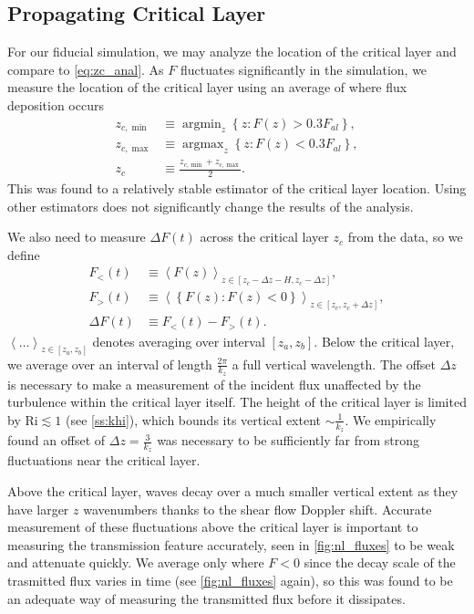 \documentclass[
        fleqn,
        usenatbib,
    ]{mnras}
\newcommand*{\ev}[1]{\left\langle#1\right\rangle}
\newcommand*{\z}[1]{\left\{#1\right\}}
\DeclareMathOperator*{\argmin}{argmin}
\DeclareMathOperator*{\argmax}{argmax}
\begin{document}
\subsection{Propagating Critical Layer}

For our fiducial simulation, we may analyze the location of the critical layer
and compare to \autoref{eq:zc_anal}. As $F$ fluctuates significantly in the
simulation, we measure the location of the critical layer using an average of
where flux deposition occurs
\begin{align}
    z_{c, \min} &\equiv \argmin_z \z{z: F(z) > 0.3F_{al}},\\
    z_{c, \max} &\equiv \argmax_z \z{z: F(z) < 0.3F_{al}},\\
    z_c &\equiv \frac{z_{c, \min} + z_{c, \max}}{2}.\label{eq:zc_def}
\end{align}
This was found to a relatively stable estimator of the critical layer location.
Using other estimators does not significantly change the results of the
analysis.

We also need to measure $\Delta F(t)$ across the critical layer $z_c$ from the
data, so we define
\begin{align}
    F_{<}(t) &\equiv \ev{F(z)}_{z \in [z_c - \Delta z - H, z_c - \Delta z]}
        ,\label{eq:sbelow_def}\\
    F_>(t) &\equiv \ev{\z{F(z): F(z) < 0}}_{z \in [z_c, z_c + \Delta z]},
        \label{eq:sabove_def}\\
    \Delta F(t) &\equiv F_<(t) - F_{>}(t).\label{eq:ds_def}
\end{align}
$\ev{\dots}_{z \in [z_a, z_b]}$ denotes averaging over interval $[z_a, z_b]$.
Below the critical layer, we average over an interval of length
$\frac{2\pi}{k_{z}}$ a full vertical wavelength. The offset $\Delta z$ is
necessary to make a measurement of the incident flux unaffected by the
turbulence within the critical layer itself. The height of the critical layer is
limited by $\mathrm{Ri} \lesssim 1$ (see \autoref{ss:khi}), which bounds its
vertical extent $\sim \frac{1}{k_{z}}$. We empirically found an offset of
$\Delta z = \frac{3}{k_z}$ was necessary to be sufficiently far from strong
fluctuations near the critical layer.

Above the critical layer, waves decay over a much smaller vertical extent as
they have larger $z$ wavenumbers thanks to the shear flow Doppler shift.
Accurate measurement of these fluctuations above the critical layer is important
to measuring the transmission feature accurately, seen in
\autoref{fig:nl_fluxes} to be weak and attenuate quickly. We average only where
$F < 0$ since the decay scale of the trasmitted flux varies in time (see
\autoref{fig:nl_fluxes} again), so this was found to be an adequate way of
measuring the transmitted flux before it dissipates.
\end{document}
